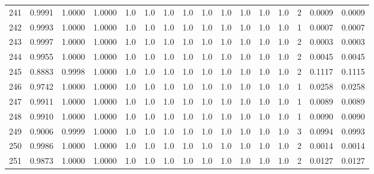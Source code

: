 \begin{tabular}{lrrrrrrrrrrrrrrr}
241 &      0.9991 &  1.0000 &  1.0000 &     1.0 &     1.0 &     1.0 &     1.0 &     1.0 &     1.0 &     1.0 &      1.0 &        1.0 &      2 &                    0.0009 &                     0.0009 \\
242 &      0.9993 &  1.0000 &  1.0000 &     1.0 &     1.0 &     1.0 &     1.0 &     1.0 &     1.0 &     1.0 &      1.0 &        1.0 &      1 &                    0.0007 &                     0.0007 \\
243 &      0.9997 &  1.0000 &  1.0000 &     1.0 &     1.0 &     1.0 &     1.0 &     1.0 &     1.0 &     1.0 &      1.0 &        1.0 &      2 &                    0.0003 &                     0.0003 \\
244 &      0.9955 &  1.0000 &  1.0000 &     1.0 &     1.0 &     1.0 &     1.0 &     1.0 &     1.0 &     1.0 &      1.0 &        1.0 &      2 &                    0.0045 &                     0.0045 \\
245 &      0.8883 &  0.9998 &  1.0000 &     1.0 &     1.0 &     1.0 &     1.0 &     1.0 &     1.0 &     1.0 &      1.0 &        1.0 &      2 &                    0.1117 &                     0.1115 \\
246 &      0.9742 &  1.0000 &  1.0000 &     1.0 &     1.0 &     1.0 &     1.0 &     1.0 &     1.0 &     1.0 &      1.0 &        1.0 &      1 &                    0.0258 &                     0.0258 \\
247 &      0.9911 &  1.0000 &  1.0000 &     1.0 &     1.0 &     1.0 &     1.0 &     1.0 &     1.0 &     1.0 &      1.0 &        1.0 &      1 &                    0.0089 &                     0.0089 \\
248 &      0.9910 &  1.0000 &  1.0000 &     1.0 &     1.0 &     1.0 &     1.0 &     1.0 &     1.0 &     1.0 &      1.0 &        1.0 &      1 &                    0.0090 &                     0.0090 \\
249 &      0.9006 &  0.9999 &  1.0000 &     1.0 &     1.0 &     1.0 &     1.0 &     1.0 &     1.0 &     1.0 &      1.0 &        1.0 &      3 &                    0.0994 &                     0.0993 \\
250 &      0.9986 &  1.0000 &  1.0000 &     1.0 &     1.0 &     1.0 &     1.0 &     1.0 &     1.0 &     1.0 &      1.0 &        1.0 &      2 &                    0.0014 &                     0.0014 \\
251 &      0.9873 &  1.0000 &  1.0000 &     1.0 &     1.0 &     1.0 &     1.0 &     1.0 &     1.0 &     1.0 &      1.0 &        1.0 &      2 &                    0.0127 &                     0.0127 \\

\end{tabular}
